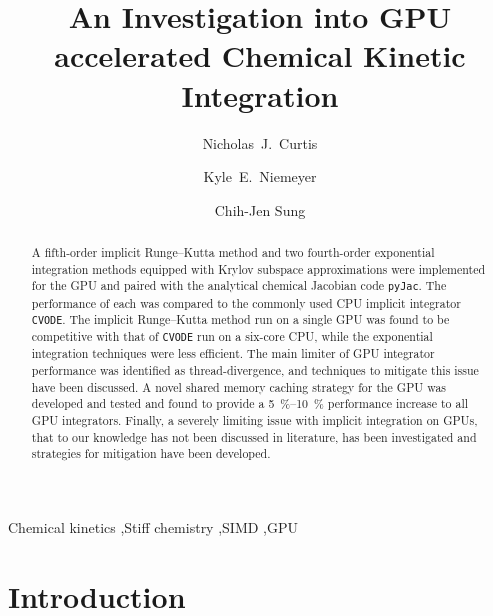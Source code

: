 \documentclass[preprint]{elsarticle}
\begin{document}
\begin{frontmatter}

\title{An Investigation into GPU accelerated Chemical Kinetic Integration}

\author[uconn]{Nicholas~J.\ Curtis}
\author[osu]{Kyle~E.\ Niemeyer}
\author[uconn]{Chih-Jen Sung}

\address[uconn]{Department of Mechanical Engineering\\
  University of Connecticut, Storrs, CT, 06269, USA}
\address[osu]{School of Mechanical, Industrial, and Manufacturing Engineering\\
  Oregon State University, Corvallis, OR 97331, USA}
  

\begin{abstract}
A fifth-order implicit Runge--Kutta method and two fourth-order exponential integration methods equipped with Krylov subspace approximations were implemented for the GPU and paired with the analytical chemical Jacobian code \texttt{pyJac}.
The performance of each was compared to the commonly used CPU implicit integrator \texttt{CVODE}.
The implicit Runge--Kutta method run on a single GPU was found to be competitive with that of \texttt{CVODE} run on a six-core CPU, while the exponential integration techniques were less efficient.
The main limiter of GPU integrator performance was identified as thread-divergence, and techniques to mitigate this issue have been discussed.
A novel shared memory caching strategy for the GPU was developed and tested and found to provide a \SIrange{5}{10}{\percent} performance increase to all GPU integrators.
Finally, a severely limiting issue with implicit integration on GPUs, that to our knowledge has not been discussed in literature, has been investigated and strategies for mitigation have been developed.
\end{abstract}

\begin{keyword}
 Chemical kinetics \sep Stiff chemistry \sep SIMD \sep GPU
\end{keyword}

\end{frontmatter}
\pagebreak

\section{Introduction}
\label{sec:Intro}
\end{document}
